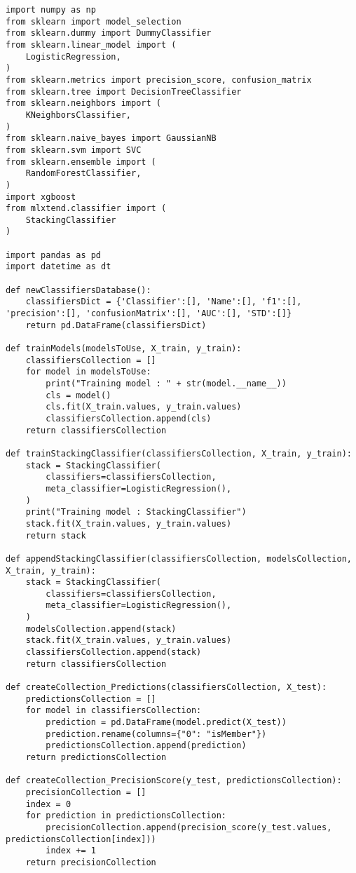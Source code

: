 \newpage\begin{lstlisting}[caption={Fonctions permettant de créer et d'entraîner des classifieurs}]
import numpy as np
from sklearn import model_selection
from sklearn.dummy import DummyClassifier
from sklearn.linear_model import (
    LogisticRegression,
)
from sklearn.metrics import precision_score, confusion_matrix
from sklearn.tree import DecisionTreeClassifier
from sklearn.neighbors import (
    KNeighborsClassifier,
)
from sklearn.naive_bayes import GaussianNB
from sklearn.svm import SVC
from sklearn.ensemble import (
    RandomForestClassifier,
)
import xgboost
from mlxtend.classifier import (
    StackingClassifier
)

import pandas as pd
import datetime as dt

def newClassifiersDatabase():
    classifiersDict = {'Classifier':[], 'Name':[], 'f1':[], 'precision':[], 'confusionMatrix':[], 'AUC':[], 'STD':[]}
    return pd.DataFrame(classifiersDict)

def trainModels(modelsToUse, X_train, y_train):
    classifiersCollection = []
    for model in modelsToUse:
        print("Training model : " + str(model.__name__))
        cls = model()
        cls.fit(X_train.values, y_train.values)
        classifiersCollection.append(cls)
    return classifiersCollection

def trainStackingClassifier(classifiersCollection, X_train, y_train):
    stack = StackingClassifier(
        classifiers=classifiersCollection,
        meta_classifier=LogisticRegression(),
    )
    print("Training model : StackingClassifier")
    stack.fit(X_train.values, y_train.values)
    return stack

def appendStackingClassifier(classifiersCollection, modelsCollection, X_train, y_train):
    stack = StackingClassifier(
        classifiers=classifiersCollection,
        meta_classifier=LogisticRegression(),
    )
    modelsCollection.append(stack)
    stack.fit(X_train.values, y_train.values)
    classifiersCollection.append(stack)
    return classifiersCollection

def createCollection_Predictions(classifiersCollection, X_test):
    predictionsCollection = []
    for model in classifiersCollection:
        prediction = pd.DataFrame(model.predict(X_test))
        prediction.rename(columns={"0": "isMember"})
        predictionsCollection.append(prediction)
    return predictionsCollection

def createCollection_PrecisionScore(y_test, predictionsCollection):
    precisionCollection = []
    index = 0
    for prediction in predictionsCollection:
        precisionCollection.append(precision_score(y_test.values, predictionsCollection[index]))
        index += 1
    return precisionCollection


\end{lstlisting}
